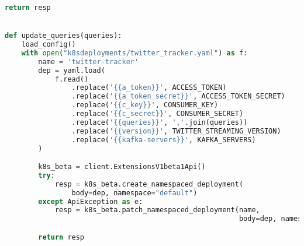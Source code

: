 \begin{lstlisting}[language=Python]
        return resp


def update_queries(queries):
    load_config()
    with open("k8sdeployments/twitter_tracker.yaml") as f:
        name = 'twitter-tracker'
        dep = yaml.load(
            f.read()
                .replace('{{a_token}}', ACCESS_TOKEN)
                .replace('{{a_token_secret}}', ACCESS_TOKEN_SECRET)
                .replace('{{c_key}}', CONSUMER_KEY)
                .replace('{{c_secret}}', CONSUMER_SECRET)
                .replace('{{queries}}', ','.join(queries))
                .replace('{{version}}', TWITTER_STREAMING_VERSION)
                .replace('{{kafka-servers}}', KAFKA_SERVERS)
        )

        k8s_beta = client.ExtensionsV1beta1Api()
        try:
            resp = k8s_beta.create_namespaced_deployment(
                body=dep, namespace="default")
        except ApiException as e:
            resp = k8s_beta.patch_namespaced_deployment(name,
                                                        body=dep, namespace="default")

        return resp
\end{lstlisting}


